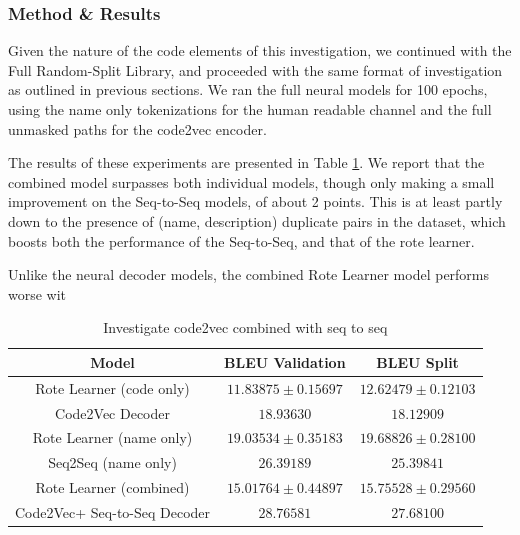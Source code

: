 \subsubsection{Method \& Results} %

Given the nature of the code elements of this investigation, we continued with the Full Random-Split Library, and proceeded with the same format of investigation as outlined in previous sections. 
We ran the full neural models for 100 epochs, using the name only tokenizations for the human readable channel and the full unmasked paths for the code2vec encoder.

The results of these experiments are presented in Table \ref{table:code2vec_embed}. 
We report that the combined model surpasses both individual models, though only making a small improvement on the Seq-to-Seq models, of about 2 points. 
This is at least partly down to the presence of (name, description) duplicate pairs in the dataset, which boosts both the performance of the Seq-to-Seq, and that of the rote learner.

Unlike the neural decoder models, the combined Rote Learner model performs worse wit 


\begin{table}[h!]
\begin{center}
\begin{tabular}{ c | c | c  }
    Model                             & BLEU Validation  & BLEU Split     \\
    \hline
    Rote Learner  (code only)        & $ 11.83875 \pm  0.15697 $ & $ 12.62479 \pm 0.12103 $ \\
    Code2Vec Decoder                 & $ 18.93630 $ & $ 18.12909 $ \\
    \hline
    \hline
    Rote Learner  (name only)         & $ 19.03534 \pm  0.35183 $ & $ 19.68826 \pm 0.28100 $ \\
    Seq2Seq (name only)               & $ 26.39189 $ & $ 25.39841 $ \\
    \hline
    \hline
    Rote Learner (combined)            & $ 15.01764 \pm  0.44897 $ & $ 15.75528 \pm 0.29560 $ \\
    Code2Vec+ Seq-to-Seq Decoder       & $ 28.76581 $ & $ 27.68100 $ \\
    \hline
\end{tabular}
\caption {Investigate code2vec combined with seq to seq}
\label{table:code2vec_embed}
\end{center}
\end{table}

